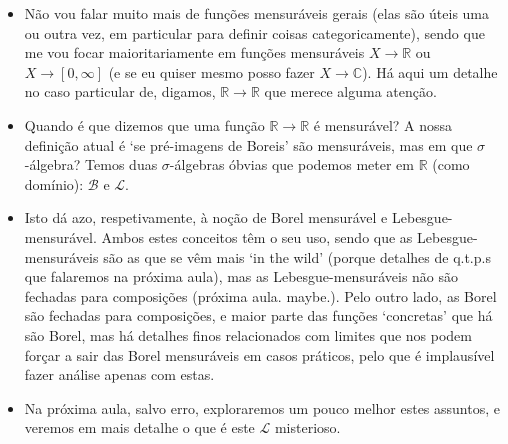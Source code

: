 \documentclass{article}
\newcommand{\R}{\mathbb{R}}
\newcommand{\C}{\mathbb{C}}
\begin{document}
\begin{itemize}
\item Não vou falar muito mais de funções mensuráveis gerais (elas são úteis uma ou outra vez, em particular para definir coisas categoricamente), sendo que me vou focar maioritariamente em funções mensuráveis $X \to \R$ ou $X \to [0,\infty]$ (e se eu quiser mesmo posso fazer $X \to \C$). Há aqui um detalhe no caso particular de, digamos, $\R \to \R$ que merece alguma atenção.
\item Quando é que dizemos que uma função $\R \to \R$ é mensurável? A nossa definição atual é `se pré-imagens de Boreis' são mensuráveis, mas em que $\sigma$-álgebra? Temos duas $\sigma$-álgebras óbvias que podemos meter em $\R$ (como domínio): $\mathcal B$ e $\mathcal L$.
\item Isto dá azo, respetivamente, à noção de Borel mensurável e Lebesgue-mensurável. Ambos estes conceitos têm o seu uso, sendo que as Lebesgue-mensuráveis são as que se vêm mais `in the wild' (porque detalhes de q.t.p.s que falaremos na próxima aula), mas as Lebesgue-mensuráveis não são fechadas para composições (próxima aula. maybe.). Pelo outro lado, as Borel são fechadas para composições, e maior parte das funções `concretas' que há são Borel, mas há detalhes finos relacionados com limites que nos podem forçar a sair das Borel mensuráveis em casos práticos, pelo que é implausível fazer análise apenas com estas.
\item Na próxima aula, salvo erro, exploraremos um pouco melhor estes assuntos, e veremos em mais detalhe o que é este $\mathcal L$ misterioso.
\end{itemize}
\end{document}
